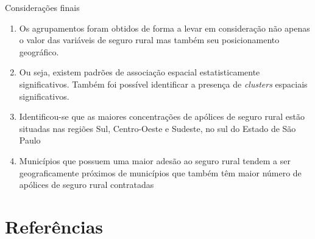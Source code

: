 \documentclass[aspectratio=169]{beamer}
\begin{document}
\begin{frame}{Considerações finais}
	\begin{enumerate}
	    \item Os agrupamentos foram obtidos de forma a levar em consideração não apenas o valor das variáveis de seguro rural mas também seu posicionamento geográfico.
		\vspace{0.25cm}
		\item Ou seja, existem padrões de associação espacial estatisticamente significativos. Também foi possível identificar a presença de \textit{clusters} espaciais significativos.     	\vspace{0.25cm}
		\item  Identificou-se que as maiores concentrações de apólices de seguro rural estão situadas nas regiões Sul, Centro-Oeste e Sudeste, no sul do Estado de São Paulo
		\vspace{0.25cm}
		\item Municípios que possuem uma maior adesão ao seguro rural tendem a ser geograficamente próximos de municípios que também têm maior número de apólices de seguro rural contratadas
		\vspace{0.25cm}
	\end{enumerate}
\end{frame}

\section{Referências}
\end{document}
